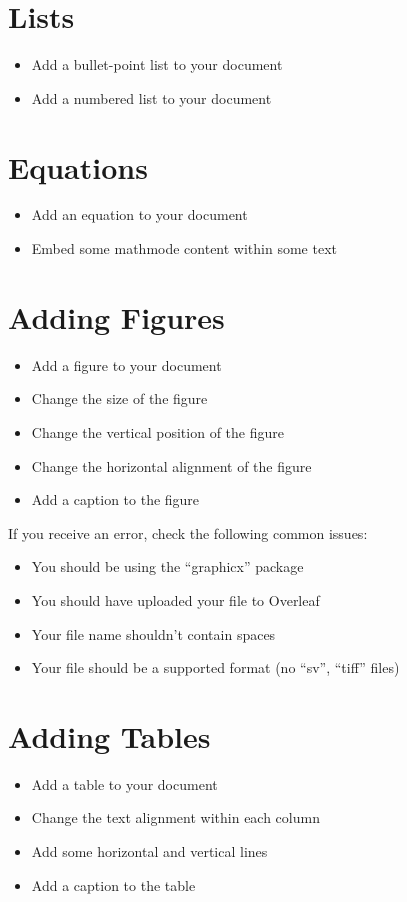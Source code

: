\documentclass[11pt,a4paper]{article}
\begin{document}
\section{Lists}
\begin{itemize}
\item Add a bullet-point list to your document
\item Add a numbered list to your document
\end{itemize}

\section{Equations}
\begin{itemize}
\item Add an equation to your document
\item Embed some mathmode content within some text
\end{itemize}

\section{Adding Figures}
\begin{itemize}
\item Add a figure to your document
\item Change the size of the figure
\item Change the vertical position of the figure
\item Change the horizontal alignment of the figure
\item Add a caption to the figure
\end{itemize}

If you receive an error, check the following common issues:

\begin{itemize}
\item You should be using the ``graphicx'' package
\item You should have uploaded your file to Overleaf
\item Your file name shouldn't contain spaces
\item Your file should be a supported format (no ``sv'', ``tiff'' files)
\end{itemize}

\section{Adding Tables}
\begin{itemize}
\item Add a table to your document
\item Change the text alignment within each column
\item Add some horizontal and vertical lines
\item Add a caption to the table
\end{itemize}
\end{document}
